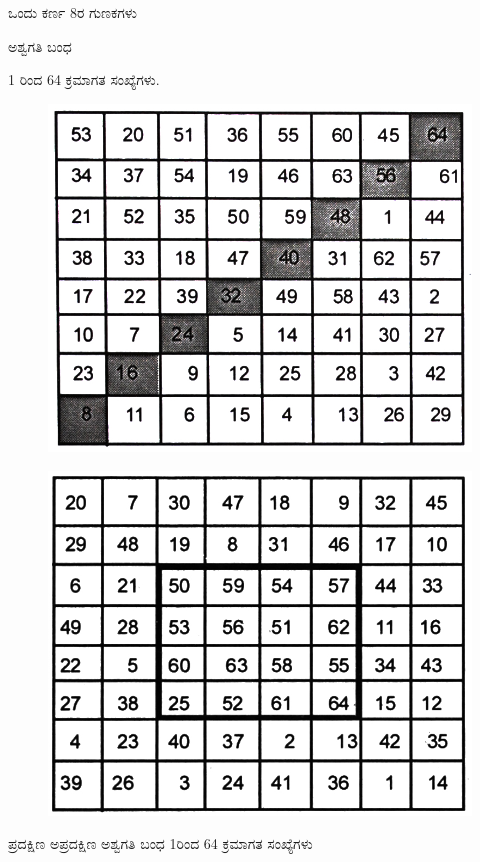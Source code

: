 ಒಂದು ಕರ್ಣ 8ರ ಗುಣಕಗಳು

ಅಶ್ವಗತಿ ಬಂಧ

1 ರಿಂದ 64 ಕ್ರಮಾಗತ ಸಂಖ್ಯೆಗಳು.
\begin{figure}[H]
\includegraphics{src/figures/chap6/fig6.21.jpg}
\end{figure}
\begin{figure}[H]
\includegraphics{src/figures/chap6/fig6.22.jpg}
\end{figure}

ಪ್ರದಕ್ಷಿಣ ಅಪ್ರದಕ್ಷಿಣ ಅಶ್ವಗತಿ ಬಂಧ 1ರಿಂದ 64 ಕ್ರಮಾಗತ ಸಂಖ್ಯೆಗಳು

